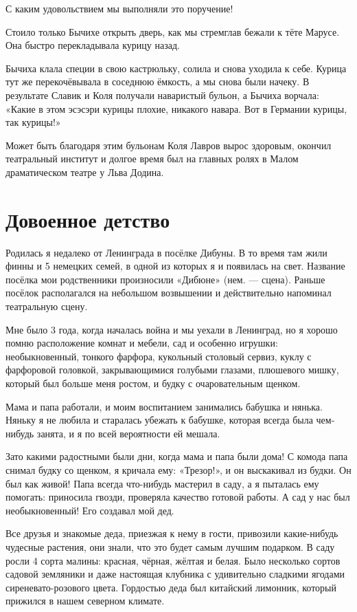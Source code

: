 С каким удовольствием мы выполняли это поручение!

Стоило только Бычихе открыть дверь, как мы стремглав бежали к тёте Марусе.
Она быстро перекладывала курицу назад.

Бычиха клала специи в свою кастрюльку, солила и снова уходила к себе.
Курица тут же перекочёвывала в соседнюю ёмкость, а мы снова были начеку.
В результате Славик и Коля получали наваристый бульон, а Бычиха ворчала: «Какие в этом эсэсэри курицы плохие, никакого навара.
Вот в Германии курицы, так курицы!»

Может быть благодаря этим бульонам Коля Лавров вырос здоровым, окончил театральный институт и долгое время был на главных ролях в Малом драматическом театре у Льва Додина.

\section*{Довоенное детство}

Родилась я недалеко от Ленинграда в посёлке Дибуны.
В то время там жили финны и 5 немецких семей, в одной из которых я и появилась на свет.
Название посёлка мои родственники произносили «Дибюне» (нем. --- сцена).
Раньше посёлок располагался на небольшом возвышении и действительно напоминал театральную сцену.

Мне было 3 года, когда началась война и мы уехали в Ленинград, но я хорошо помню расположение комнат и мебели, сад и особенно игрушки: необыкновенный, тонкого фарфора, кукольный столовый сервиз, куклу с фарфоровой головкой, закрывающимися голубыми глазами, плюшевого мишку, который был больше меня ростом, и будку с очаровательным щенком.

Мама и папа работали, и моим воспитанием занимались бабушка и нянька.
Няньку я не любила и старалась убежать к бабушке, которая всегда была чем-нибудь занята, и я по всей вероятности ей мешала.

Зато какими радостными были дни, когда мама и папа были дома! 
С комода папа снимал будку со щенком, я кричала ему: «Трезор!», и он выскакивал из будки.
Он был как живой! 
Папа всегда что-нибудь мастерил в саду, а я пыталась ему помогать: приносила гвозди, проверяла качество готовой работы.
А сад у нас был необыкновенный! 
Его создавал мой дед.

Все друзья и знакомые деда, приезжая к нему в гости, привозили какие-нибудь чудесные растения, они знали, что это будет самым лучшим подарком.
В саду росли 4 сорта малины: красная, чёрная, жёлтая и белая.
Было несколько сортов садовой земляники и даже настоящая клубника с удивительно сладкими ягодами сиреневато-розового цвета.
Гордостью деда был китайский лимонник, который прижился в нашем северном климате.

